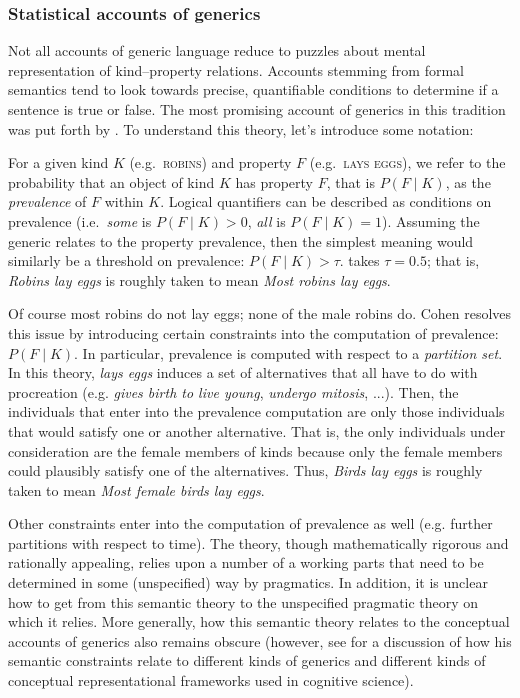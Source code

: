 \documentclass[12pt,letterpaper]{article}
\begin{document}


\subsubsection*{Statistical accounts of generics}

Not all accounts of generic language reduce to puzzles about mental representation of kind--property relations.
Accounts stemming from formal semantics tend to look towards precise, quantifiable conditions to determine if a sentence is true or false.
The most promising account of generics in this tradition was put forth by .
To understand this theory, let's introduce some notation:

For a given kind $K$ (e.g.~\textsc{robins}) and property $F$ (e.g.~\textsc{lays eggs}), we refer to the probability that an object of kind $K$ has property $F$, that is $P(F\mid K)$, as the \emph{prevalence} of $F$ within $K$.
Logical quantifiers can be described as conditions on prevalence (i.e.~\emph{some} is $P(F\mid K)>0$, \emph{all} is $P(F\mid K)=1$). 
Assuming the generic relates to the property prevalence, then the simplest meaning would similarly be a threshold on prevalence: $P(F\mid K)>\tau$.  takes $\tau = 0.5$; that is, \emph{Robins lay eggs} is roughly taken to mean \emph{Most robins lay eggs}. 

Of course most robins do not lay eggs; none of the male robins do. Cohen resolves this issue by introducing certain constraints into the computation of prevalence: $P(F\mid K)$. In particular, prevalence is computed with respect to a \emph{partition set}. In this theory, \emph{lays eggs} induces a set of alternatives that all have to do with procreation (e.g. \emph{gives birth to live young}, \emph{undergo mitosis}, ...). Then, the individuals that enter into the prevalence computation are only those individuals that would satisfy one or another alternative. 
That is, the only individuals under consideration are the female members of kinds because only the female members could plausibly satisfy one of the alternatives.
Thus, \emph{Birds lay eggs} is roughly taken to mean \emph{Most female birds lay eggs}. 

Other constraints enter into the computation of prevalence as well (e.g. further partitions with respect to time). 
The theory, though mathematically rigorous and rationally appealing, relies upon a number of a working parts that need to be determined in some (unspecified) way by pragmatics. 
In addition, it is unclear how to get from this semantic theory to the unspecified pragmatic theory on which it relies.
More generally, how this semantic theory relates to the conceptual accounts of generics also remains obscure (however, see  for a discussion of how his semantic constraints relate to different kinds of generics and different kinds of conceptual representational frameworks used in cognitive science).
\end{document}
